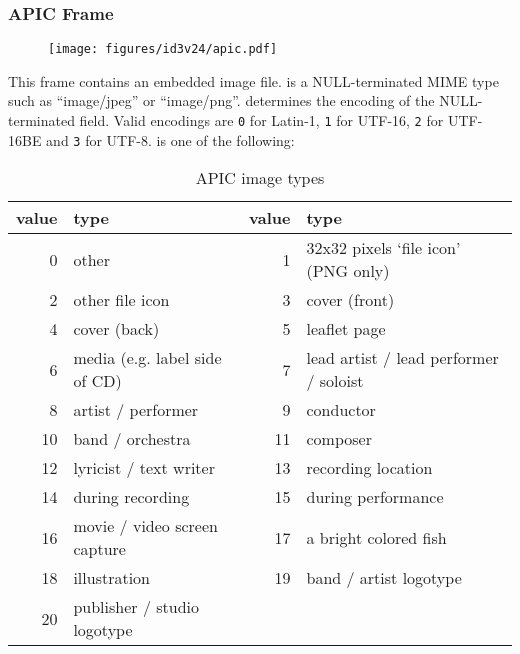 \clearpage

\subsubsection{APIC Frame}
\begin{figure}[h]
\texttt{[image: figures/id3v24/apic.pdf]}
\end{figure}
\par
\noindent
This frame contains an embedded image file.
 is a NULL-terminated MIME type such as ``image/jpeg''
or ``image/png''.
 determines the encoding of the NULL-terminated
 field.
Valid encodings are \texttt{0} for Latin-1,
\texttt{1} for UTF-16,
\texttt{2} for UTF-16BE
and \texttt{3} for UTF-8.
 is one of the following:
\begin{table}[h]
{
\begin{tabular}{|r|l||r|l|}
\hline
value & type & value & type \\
\hline
0 & other & 1 & 32x32 pixels `file icon' (PNG only) \\
2 & other file icon & 3 & cover (front) \\
4 & cover (back) & 5 & leaflet page \\
6 & media (e.g. label side of CD) & 7 & lead artist / lead performer / soloist \\
8 & artist / performer & 9 & conductor \\
10 & band / orchestra & 11 & composer \\
12 & lyricist / text writer & 13 & recording location \\
14 & during recording & 15 & during performance \\
16 & movie / video screen capture & 17 & a bright colored fish \\
18 & illustration & 19 & band / artist logotype \\
20 & publisher / studio logotype & &  \\
\hline
\end{tabular}
\caption{APIC image types}
}
\end{table}

\clearpage

